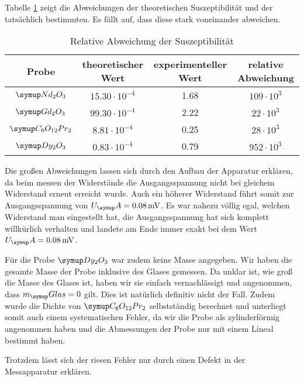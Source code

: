 Tabelle \ref{tab:rel} zeigt die Abweichungen der theoretischen Suszeptibilität und
der tatsächlich bestimmten. Es fällt auf, dass diese stark voneinander
abweichen.
\begin{table}
  \centering
  \begin{tabular}{c c c c}
    \toprule
     Probe & theoretischer Wert & experimenteller Wert & relative Abweichung \\
     \midrule
     $\su{Nd_2O_3}$       &  $ 15.30 \cdot 10^{-4}$ & 1.68 & $109 \cdot 10^3$\\
     $\su{Gd_2O_3}$       &  $ 99.30 \cdot 10^{-4}$ & 2.22 & $ 22 \cdot 10^3$\\
     $\su{C_6O_{12}Pr_2}$ &  $ 8.81 \cdot 10^{-4}$ & 0.25  & $ 28 \cdot 10^3$\\
     $\su{Dy_2O_3}$       &  $ 0.83 \cdot 10^{-4}$ & 0.79  & $952 \cdot 10^3$\\
     \bottomrule
  \end{tabular}
  \caption{Relative Abweichung der Suszeptibilität}
  \label{tab:rel}
\end{table}
Die großen Abweichungen lassen sich durch den Aufbau der Apparatur erklären, da
beim messen der Widerstände die Ausgangsspannung nicht bei gleichem Widerstand
erneut erreicht wurde. Auch ein höherer Widerstand führt somit zur Ausgangsspannung
von $U_\su{A}= 0.08\mV$. Es war nahezu völlig egal, welchen Widerstand man eingestellt hat,
die Ausgangsspannung hat sich komplett willkürlich verhalten und landete am Ende
immer exakt bei dem Wert $U_\su{A} = 0.08\mV$.

Für die Probe $\su{Dy_2O_3}$ war zudem keine Masse angegeben. Wir haben die gesamte
Masse der Probe inklusive des Glases gemessen. Da unklar ist,
wie groß die Masse des Glases ist, haben wir sie einfach vernachlässigt und angenommen,
dass $m_\su{Glas} = 0$ gilt. Dies ist natürlich definitiv nicht der Fall.
Zudem wurde die Dichte von $\su{C_6O_{12}Pr_2}$ selbstständig berechnet und unterliegt
somit auch einem systematischen Fehler, da wir die Probe als zylinderförmig angenommen
haben und die Abmessungen der Probe nur mit einem Lineal bestimmt haben.

Trotzdem lässt sich der riesen Fehler nur durch einen Defekt in der Messapparatur
erklären.
